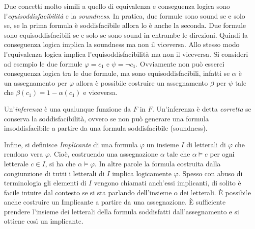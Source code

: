 \documentclass[./main.tex]{subfiles}
\begin{document}
Due concetti molto simili a quello di equivalenza e conseguenza logica sono l'\textit{equisoddisfacibilità} e la \textit{soundness}. In pratica, due formule sono sound
se e solo se, se la prima formula è soddisfacibile allora lo è anche la seconda. Due formule sono equisoddisfacibili se e solo se sono sound in entrambe le direzioni. 
Quindi la conseguenza logica implica la soundness ma non il viceversa. Allo stesso modo l'equivalenza
logica implica l'equisoddisfacibilità ma non il viceversa. Si consideri ad esempio le due formule $\varphi = c_1$ e $\psi = \lnot c_1$. Ovviamente non 
può esserci conseguenza logica tra le due formule, ma sono equisoddisfacibili, infatti se $\alpha$ è un assegnamento per $\varphi$ allora è possibile
costruire un assegnamento $\beta$ per $\psi$ tale che $\beta(c_1) = 1-\alpha(c_1)$ e viceversa.

Un'\textit{inferenza} è una qualunque funzione da $F$ in $F$. Un'inferenza è detta \textit{corretta} se conserva la soddisfacibilità, ovvero 
se non può generare una formula insoddisfacibile a partire da una formula soddisfacibile (soundness).

Infine, si definisce \textit{Implicante} di una formula $\varphi$ un insieme $I$ di letterali di $\varphi$ che rendono vera $\varphi$. Cioè, costruendo una
assegnazione $\alpha$ tale che $\alpha \models c$ per ogni letterale $c \in I$, si ha che $\alpha \models \varphi$. In altre parole la formula 
costruita dalla congiunzione di tutti i letterali di $I$ implica logicamente $\varphi$. Spesso con abuso di terminologia gli elementi di $I$ vengono chiamati
anch'essi implicanti, di solito è facile intuire dal contesto se si sta parlando dell'insieme o dei letterali.
È possibile anche costruire un Implicante a partire da una assegnazione. È sufficiente prendere l'insieme dei letterali della formula soddisfatti dall'assegnamento e 
si ottiene così un implicante.


\end{document}
